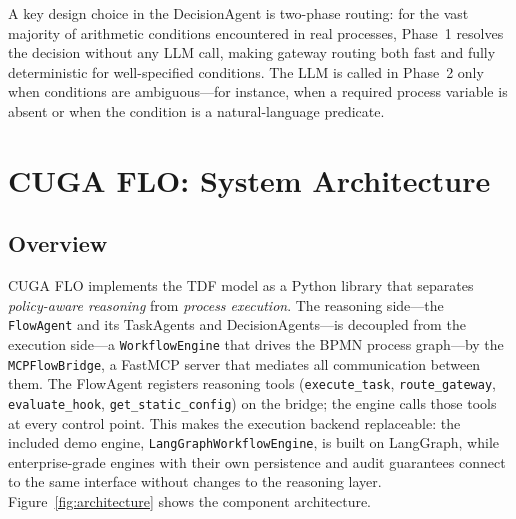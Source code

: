 \documentclass[11pt,a4paper]{article}
\begin{document}
A key design choice in the DecisionAgent is two-phase routing: for the vast
majority of arithmetic conditions encountered in real processes, Phase~1 resolves
the decision without any LLM call, making gateway routing both fast and fully
deterministic for well-specified conditions. The LLM is called in Phase~2 only
when conditions are ambiguous---for instance, when a required process variable is
absent or when the condition is a natural-language predicate.

\section{CUGA FLO: System Architecture}
\label{sec:system}

\subsection{Overview}

CUGA FLO implements the TDF model as a Python library that separates
\emph{policy-aware reasoning} from \emph{process execution}. The reasoning side---the
\texttt{FlowAgent} and its TaskAgents and DecisionAgents---is decoupled from the
execution side---a \texttt{WorkflowEngine} that drives the BPMN process graph---by
the \texttt{MCPFlowBridge}, a FastMCP server that mediates all communication between
them. The FlowAgent registers reasoning tools (\texttt{execute\_task},
\texttt{route\_gateway}, \texttt{evaluate\_hook}, \texttt{get\_static\_config}) on the
bridge; the engine calls those tools at every control point. This makes the execution
backend replaceable: the included demo engine, \texttt{LangGraphWorkflowEngine}, is
built on LangGraph, while enterprise-grade engines with their own persistence and
audit guarantees connect to the same interface without changes to the reasoning layer.
Figure~\ref{fig:architecture} shows the component architecture.
\end{document}
